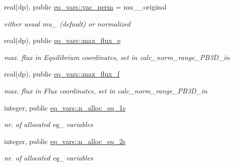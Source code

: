 \begin{DoxyCompactItemize}
real(dp), public \hyperlink{namespaceeq__vars_ac45a3781896236d8c8fe95d920f7337c}{eq\+\_\+vars\+::vac\+\_\+perm} = mu\+\_\+\_\+original
\begin{DoxyCompactList}\small\item\em either usual mu\+\_ (default) or normalized \end{DoxyCompactList}\item 
real(dp), public \hyperlink{namespaceeq__vars_a863feef76ae60309d2e3ed4eed6bd436}{eq\+\_\+vars\+::max\+\_\+flux\+\_\+e}
\begin{DoxyCompactList}\small\item\em max. flux in Equilibrium coordinates, set in calc\+\_\+norm\+\_\+range\+\_\+\+P\+B3\+D\+\_\+in \end{DoxyCompactList}\item 
real(dp), public \hyperlink{namespaceeq__vars_a46c97bf2a6d6eca952ca5173fcf9cdcb}{eq\+\_\+vars\+::max\+\_\+flux\+\_\+f}
\begin{DoxyCompactList}\small\item\em max. flux in Flux coordinates, set in calc\+\_\+norm\+\_\+range\+\_\+\+P\+B3\+D\+\_\+in \end{DoxyCompactList}\item 
integer, public \hyperlink{namespaceeq__vars_aed1853ac20f0da0be39ab8ef82993c4d}{eq\+\_\+vars\+::n\+\_\+alloc\+\_\+eq\+\_\+1s}
\begin{DoxyCompactList}\small\item\em nr. of allocated {\ttfamily eq\+\_} variables \end{DoxyCompactList}\item 
integer, public \hyperlink{namespaceeq__vars_af75297445b32de13371da989074dd454}{eq\+\_\+vars\+::n\+\_\+alloc\+\_\+eq\+\_\+2s}
\begin{DoxyCompactList}\small\item\em nr. of allocated {\ttfamily eq\+\_} variables \end{DoxyCompactList}\end{DoxyCompactItemize}
